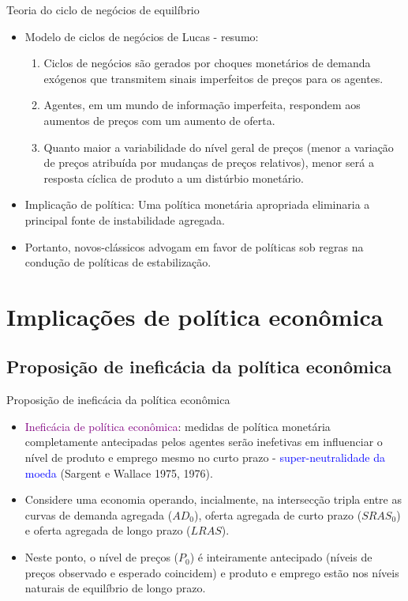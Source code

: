 \documentclass[10pt]{beamer}
\begin{document}
\begin{frame}{Teoria do ciclo de negócios de equilíbrio}
    \begin{itemize}
        \item Modelo de ciclos de negócios de Lucas - resumo:
        \bigskip
        \begin{enumerate}
            \item Ciclos de negócios são gerados por choques monetários de demanda exógenos que transmitem sinais imperfeitos de preços para os agentes.
            \bigskip
            \item Agentes, em um mundo de informação imperfeita, respondem aos aumentos de preços com um aumento de oferta.
            \bigskip
            \item Quanto maior a variabilidade do nível geral de preços (menor a variação de preços atribuída por mudanças de preços relativos), menor será a resposta cíclica de produto a um distúrbio monetário.
        \end{enumerate}
        \bigskip
        \item Implicação de política: Uma política monetária apropriada eliminaria a principal fonte de instabilidade agregada.
        \bigskip
        \item Portanto, novos-clássicos advogam em favor de políticas sob regras na condução de políticas de estabilização.
    \end{itemize}
\end{frame}

\section{Implicações de política econômica}
\subsection{Proposição de ineficácia da política econômica}

\begin{frame}{Proposição de ineficácia da política econômica}
    \begin{itemize}
        \item \textcolor{purple}{Ineficácia de política econômica}: medidas de política monetária completamente antecipadas pelos agentes serão inefetivas em influenciar o nível de produto e emprego mesmo no curto prazo - \textcolor{blue}{super-neutralidade da moeda} (Sargent e Wallace 1975, 1976).
        \bigskip
        \item Considere uma economia operando, incialmente, na intersecção tripla entre as curvas de demanda agregada ($AD_0$), oferta agregada de curto prazo ($SRAS_0$) e oferta agregada de longo prazo ($LRAS$).
        \bigskip
        \item Neste ponto, o nível de preços ($P_0$) é inteiramente antecipado (níveis de preços observado e esperado coincidem) e produto e emprego estão nos níveis naturais de equilíbrio de longo prazo.
    \end{itemize}
\end{frame}
\end{document}
